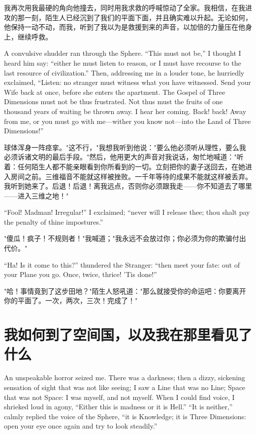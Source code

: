 \documentclass[12pt,UTF8]{ctexbook}
\begin{document}
我再次用我最硬的角向他撞去，同时用我求救的呼喊惊动了全家。我相信，在我进攻的那一刻，陌生人已经沉到了我们的平面下面，并且确实难以升起。无论如何，他保持一动不动，而我，听到了我以为是救援到来的声音，以加倍的力量压在他身上，继续呼救。

A convulsive shudder ran through the Sphere. ``This must not be,'' I thought I heard him say: ``either he must listen to reason, or I must have recourse to the last resource of civilization.'' Then, addressing me in a louder tone, he hurriedly exclaimed, ``Listen: no stranger must witness what you have witnessed. Send your Wife back at once, before she enters the apartment. The Gospel of Three Dimensions must not be thus frustrated. Not thus must the fruits of one thousand years of waiting be thrown away. I hear her coming. Back! back! Away from me, or you must go with me---wither you know not---into the Land of Three Dimensions!''

球体浑身一阵痉挛。"这不行，"我想我听到他说："要么他必须听从理性，要么我必须诉诸文明的最后手段。"然后，他用更大的声音对我说话，匆忙地喊道："听着：任何陌生人都不能亲眼看到你所看到的一切。立刻把你的妻子送回去，在她进入房间之前。三维福音不能就这样被挫败。一千年等待的成果不能就这样被丢弃。我听到她来了。后退！后退！离我远点，否则你必须跟我走——你不知道去了哪里——进入三维之地！"

``Fool! Madman! Irregular!'' I exclaimed; ``never will I release thee; thou shalt pay the penalty of thine impostures.''

"傻瓜！疯子！不规则者！"我喊道；"我永远不会放过你；你必须为你的欺骗付出代价。"

``Ha! Is it come to this?'' thundered the Stranger: ``then meet your fate: out of your Plane you go. Once, twice, thrice! 'Tis done!''

"哈！事情竟到了这步田地？"陌生人怒吼道："那么就接受你的命运吧：你要离开你的平面了。一次，两次，三次！完成了！"

\chapter{我如何到了空间国，以及我在那里看见了什么}

An unspeakable horror seized me. There was a darkness; then a dizzy, sickening sensation of sight that was not like seeing; I saw a Line that was no Line; Space that was not Space: I was myself, and not myself. When I could find voice, I shrieked loud in agony, ``Either this is madness or it is Hell.'' ``It is neither,'' calmly replied the voice of the Sphere, ``it is Knowledge; it is Three Dimensions: open your eye once again and try to look steadily.''
\end{document}
